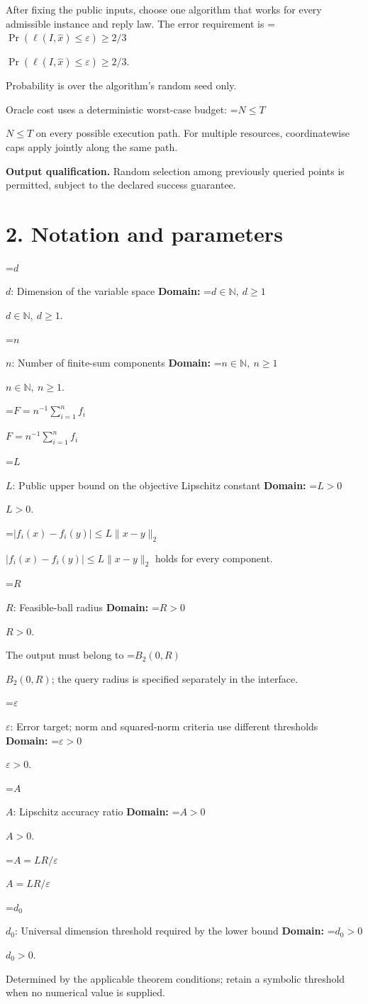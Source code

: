 \documentclass[10pt,a4paper]{article}
\newcommand{\AtlasMath}[1]{\par\begingroup\centering\setbox0=\hbox{$\displaystyle #1$}\ifdim\wd0>1.4\linewidth\typeout{ATLAS WIDE FORMULA: \the\wd0}\fi\ifdim\wd0>\linewidth\resizebox{\linewidth}{!}{\box0}\else\box0\fi\par\endgroup}
\newcommand{\AtlasInlineMath}[1]{\begingroup\setbox0=\hbox{$#1$}\ifdim\wd0>.4\linewidth\endgroup\AtlasMath{#1}\else\endgroup$#1$\fi}
\begin{document}
After fixing the public inputs, choose one algorithm that works for every admissible instance and reply law. The error requirement is \AtlasInlineMath{\Pr(\ell(I,\widehat{x})\le \varepsilon)\ge2/3}.

Probability is over the algorithm's random seed only.

Oracle cost uses a deterministic worst-case budget: \AtlasInlineMath{N\le T} on every possible execution path. For multiple resources, coordinatewise caps apply jointly along the same path.

\textbf{Output qualification.} Random selection among previously queried points is permitted, subject to the declared success guarantee.

\section{2. Notation and parameters}
\AtlasInlineMath{d}: Dimension of the variable space \textbf{Domain:} \AtlasInlineMath{d\in\mathbb{N},\ d\ge1}.

\AtlasInlineMath{n}: Number of finite-sum components \textbf{Domain:} \AtlasInlineMath{n\in\mathbb{N},\ n\ge1}.

\AtlasInlineMath{F=n^{-1}\sum_{i=1}^n f_i}

\AtlasInlineMath{L}: Public upper bound on the objective Lipschitz constant \textbf{Domain:} \AtlasInlineMath{L>0}.

\AtlasInlineMath{|f_i(x)-f_i(y)|\le L\|x-y\|_2} holds for every component.

\AtlasInlineMath{R}: Feasible-ball radius \textbf{Domain:} \AtlasInlineMath{R>0}.

The output must belong to \AtlasInlineMath{B_2(0,R)}; the query radius is specified separately in the interface.

\AtlasInlineMath{\varepsilon}: Error target; norm and squared-norm criteria use different thresholds \textbf{Domain:} \AtlasInlineMath{\varepsilon>0}.

\AtlasInlineMath{A}: Lipschitz accuracy ratio \textbf{Domain:} \AtlasInlineMath{A>0}.

\AtlasInlineMath{A=LR/\varepsilon}

\AtlasInlineMath{d_0}: Universal dimension threshold required by the lower bound \textbf{Domain:} \AtlasInlineMath{d_0>0}.

Determined by the applicable theorem conditions; retain a symbolic threshold when no numerical value is supplied.
\end{document}
